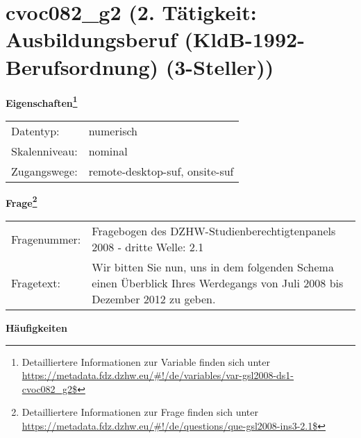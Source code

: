 
    \setcounter{footnote}{0}

    \vspace*{-1.8cm}
	\section{cvoc082\_g2 (2. Tätigkeit: Ausbildungsberuf (KldB-1992-Berufsordnung) (3-Steller))}
	\label{section:cvoc082_g2}



    \vspace*{0.5cm}
    \noindent\textbf{Eigenschaften\footnote{Detailliertere Informationen zur Variable finden sich unter
		\url{https://metadata.fdz.dzhw.eu/\#!/de/variables/var-gsl2008-ds1-cvoc082_g2$}}}\\
	\begin{tabularx}{\hsize}{@{}lX}
	Datentyp: & numerisch \\
	Skalenniveau: & nominal \\
	Zugangswege: &
	  remote-desktop-suf, 
	  onsite-suf
 \\
    \end{tabularx}



				\vspace*{0.5cm}
                \noindent\textbf{Frage\footnote{Detailliertere Informationen zur Frage finden sich unter
		              \url{https://metadata.fdz.dzhw.eu/\#!/de/questions/que-gsl2008-ins3-2.1$}}}\\
				\begin{tabularx}{\hsize}{@{}lX}
					Fragenummer: &
					  Fragebogen des DZHW-Studienberechtigtenpanels 2008 - dritte Welle:
					  2.1
 \\
					Fragetext: & Wir bitten Sie nun, uns in dem folgenden Schema einen Überblick Ihres Werdegangs von Juli 2008 bis Dezember 2012 zu geben. \\
				\end{tabularx}





        		\vspace*{0.5cm}
                \noindent\textbf{Häufigkeiten}

